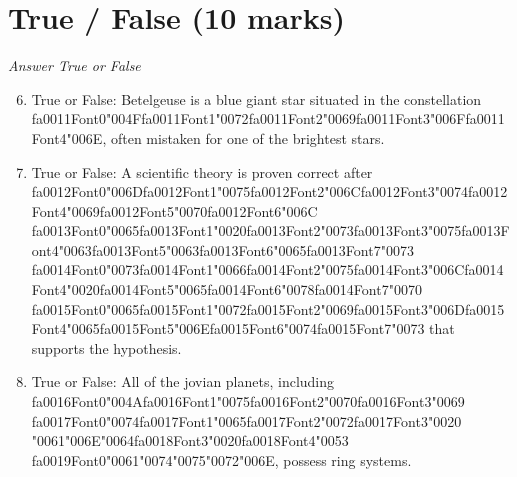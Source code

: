 \documentclass[12pt]{article}
\begin{document}
\section*{True / False (10 marks)}
\textit{Answer True or False}
\begin{enumerate}[label=\arabic*.]
\setcounter{enumi}{5}
\item True or False: Betelgeuse is a blue giant star situated in the constellation {\csname fa0011Font0\endcsname\char"004F}{\csname fa0011Font1\endcsname\char"0072}{\csname fa0011Font2\endcsname\char"0069}{\csname fa0011Font3\endcsname\char"006F}{\csname fa0011Font4\endcsname\char"006E}, often mistaken for one of the brightest stars.
\item True or False: A scientific theory is proven correct after {\csname fa0012Font0\endcsname\char"006D}{\csname fa0012Font1\endcsname\char"0075}{\csname fa0012Font2\endcsname\char"006C}{\csname fa0012Font3\endcsname\char"0074}{\csname fa0012Font4\endcsname\char"0069}{\csname fa0012Font5\endcsname\char"0070}{\csname fa0012Font6\endcsname\char"006C} {\csname fa0013Font0\endcsname\char"0065}{\csname fa0013Font1\endcsname\char"0020}{\csname fa0013Font2\endcsname\char"0073}{\csname fa0013Font3\endcsname\char"0075}{\csname fa0013Font4\endcsname\char"0063}{\csname fa0013Font5\endcsname\char"0063}{\csname fa0013Font6\endcsname\char"0065}{\csname fa0013Font7\endcsname\char"0073} {\csname fa0014Font0\endcsname\char"0073}{\csname fa0014Font1\endcsname\char"0066}{\csname fa0014Font2\endcsname\char"0075}{\csname fa0014Font3\endcsname\char"006C}{\csname fa0014Font4\endcsname\char"0020}{\csname fa0014Font5\endcsname\char"0065}{\csname fa0014Font6\endcsname\char"0078}{\csname fa0014Font7\endcsname\char"0070} {\csname fa0015Font0\endcsname\char"0065}{\csname fa0015Font1\endcsname\char"0072}{\csname fa0015Font2\endcsname\char"0069}{\csname fa0015Font3\endcsname\char"006D}{\csname fa0015Font4\endcsname\char"0065}{\csname fa0015Font5\endcsname\char"006E}{\csname fa0015Font6\endcsname\char"0074}{\csname fa0015Font7\endcsname\char"0073} that supports the hypothesis.
\item True or False: All of the jovian planets, including {\csname fa0016Font0\endcsname\char"004A}{\csname fa0016Font1\endcsname\char"0075}{\csname fa0016Font2\endcsname\char"0070}{\csname fa0016Font3\endcsname\char"0069} {\csname fa0017Font0\endcsname\char"0074}{\csname fa0017Font1\endcsname\char"0065}{\csname fa0017Font2\endcsname\char"0072}{\csname fa0017Font3\endcsname\char"0020} {\char"0061}{\char"006E}{\char"0064}{\csname fa0018Font3\endcsname\char"0020}{\csname fa0018Font4\endcsname\char"0053} {\csname fa0019Font0\endcsname\char"0061}{\char"0074}{\char"0075}{\char"0072}{\char"006E}, possess ring systems.

\end{enumerate}
\end{document}

